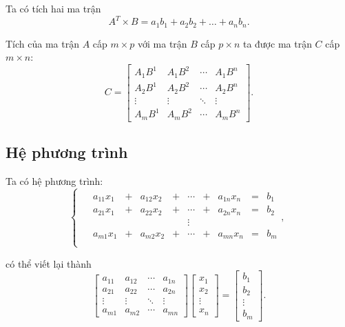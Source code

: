 \documentclass[12pt,a4paper]{report}
\begin{document}
Ta có tích hai ma trận
\begin{equation*}
A^T \times B = a_1b_1 + a_2b_2 + \ldots + a_nb_n.
\end{equation*}

 Tích của ma trận $A$ cấp $m \times p$ với ma trận $B$ cấp $p \times n$ ta được ma trận $C$ cấp $m \times n$:
\begin{equation*}
C = \begin{bmatrix}
        A_1B^1 & A_1B^2 & \cdots & A_1B^n  \\
		A_2B^1 & A_2B^2 & \cdots & A_2B^n \\
		\vdots & \vdots & \ddots & \vdots \\
		A_mB^1 & A_mB^2 & \cdots & A_mB^n
	\end{bmatrix}.
\end{equation*}
 
\subsection{Hệ phương trình}
Ta có hệ phương trình:
\begin{equation*}
\left\{\begin{split}
\begin{matrix}
& a_{11}x_1 & + & a_{12}x_2 & + & \cdots & + & a_{1n}x_n & = & b_1 \\
& a_{21}x_1 & + & a_{22}x_2 & + & \cdots & + & a_{2n}x_n & = & b_2 \\
&&&&& \vdots \\
& a_{m1}x_1 & + & a_{m2}x_2 & + & \cdots & + & a_{mn}x_n & = & b_m \\
\end{matrix},
\end{split}\right.  
\end{equation*}

có thể viết lại thành
\begin{equation}
\begin{bmatrix}
	a_{11} & a_{12} & \cdots & a_{1n} \\
	a_{21} & a_{22} & \cdots & a_{2n} \\
	\vdots & \vdots & \ddots & \vdots \\
	a_{m1} & a_{m2} & \cdots & a_{mn} 
\end{bmatrix}
\begin{bmatrix}
	x_1 \\
	x_2 \\
	\vdots \\
	x_n
\end{bmatrix}
=
\begin{bmatrix}
	b_1 \\
	b_2 \\
	\vdots \\
	b_m
\end{bmatrix}.
\end{equation}
\end{document}
